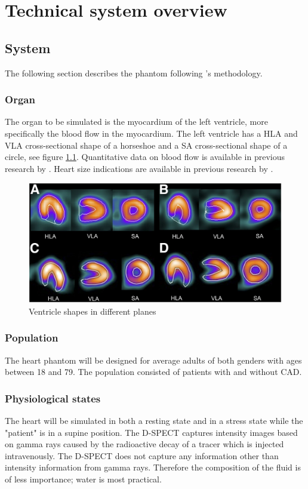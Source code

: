 \chapter{Technical system overview}
\section{System}
The following section describes the phantom following \cite{van2011modeling}'s methodology.
\subsection{Organ}
The organ to be simulated is the myocardium of the left ventricle, more specifically the blood flow in the myocardium. The left ventricle has a \ac{HLA} and \ac{VLA} cross-sectional shape of a horseshoe and a \ac{SA} cross-sectional shape of a circle, see figure \ref{fig:ventricle_shapes}. Quantitative data on blood flow is available in previous research by \cite{uren1994relation, chiribiri2013normal, ho2014dynamic, slart2015Pres}. Heart size indications are available in previous research by \cite{lin2008cardiac, maceira2006normalizedleft, maceira2006normalizedright}.

\begin{figure}[H]
	\includegraphics[scale=1]{./images/ventricle_shapes.jpg}
	\caption{Ventricle shapes in different planes\citep{yoneyama2017validation}}
	\label{fig:ventricle_shapes}
\end{figure}

\subsection{Population}
The heart phantom will be designed for average adults of both genders with ages between 18 and 79. The population consisted of patients with and without \ac{CAD}.
\subsection{Physiological states}
The heart will be simulated in both a resting state and in a stress state while the "patient" is in a supine position. The D-SPECT captures intensity images based on gamma rays caused by the radioactive decay of a tracer which is injected intravenously. The D-SPECT does not capture any information other than intensity information from gamma rays. Therefore the composition of the fluid is of less importance; water is most practical.
